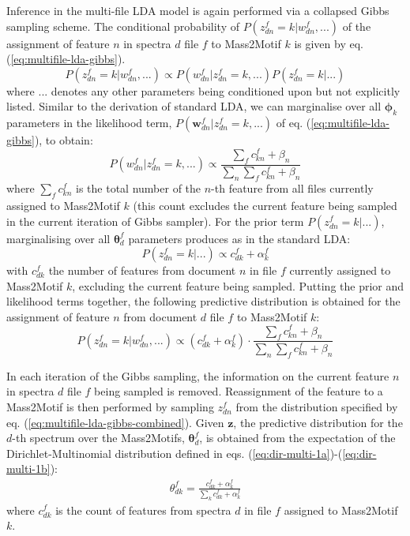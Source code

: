 Inference in the multi-file LDA model is again performed via a collapsed Gibbs sampling scheme. The conditional probability of $P({z}_{dn}^f=k \vert {w}_{dn}^f, ...)$ of the assignment of feature $n$ in spectra $d$ file $f$ to Mass2Motif $k$ is given by eq. (\ref{eq:multifile-lda-gibbs}).
\begin{equation}
P({z}_{dn}^f=k \vert {w}_{dn}^f, ...) \propto P({w}_{dn}^f \vert {z}_{dn}^f=k, ...) P({z}_{dn}^f=k \vert ...)
\label{eq:multifile-lda-gibbs}
\end{equation}
where $...$ denotes any other parameters being conditioned upon but not explicitly listed. Similar to the derivation of standard LDA, we can marginalise over all $\boldsymbol{\phi}_k$ parameters in the likelihood term, $P(\boldsymbol{w}_{dn}^f \vert {z}_{dn}^f=k, ...)$ of eq. (\ref{eq:multifile-lda-gibbs}), to obtain:
\begin{equation}
P({w}_{dn}^f \vert {z}_{dn}^f=k, ...) \propto \frac{\sum_{f} c_{kn}^f + {\beta}_n}{\sum_{n}\sum_{f} c_{kn}^f + {\beta}_n}
\label{eq:multifile-lda-gibbs-likelihood}
\end{equation}
where $\sum_{f} c_{kn}^f$ is the total number of the $n$-th feature from all files currently assigned to Mass2Motif $k$ (this count excludes the current feature being sampled in the current iteration of Gibbs sampler). For the prior term $P({z}_{dn}^f=k \vert ...)$, marginalising over all $\boldsymbol{\theta}_{d}^f$ parameters produces as in the standard LDA:
\begin{equation}
P({z}_{dn}^f=k \vert ...) \propto  c_{dk}^f + {\alpha}^f_k
\label{eq:multifile-lda-gibbs-prior}
\end{equation}
with $c_{dk}^f$ the number of features from document $n$ in file $f$ currently assigned to Mass2Motif $k$, excluding the current feature being sampled. 
Putting the prior and likelihood terms together, the following predictive distribution is obtained for the assignment of feature $n$ from document $d$ file $f$ to Mass2Motif $k$:
\begin{equation}
P({z}_{dn}^f=k \vert {w}_{dn}^f, ...) \propto (c_{dk}^f + {\alpha}^f_k) \cdot \frac{\sum_{f} c_{kn}^f + {\beta}_n}{\sum_{n}\sum_{f} c_{kn}^f + {\beta}_n}
\label{eq:multifile-lda-gibbs-combined}
\end{equation}

In each iteration of the Gibbs sampling, the information on the current feature $n$ in spectra $d$ file $f$ being sampled is removed. Reassignment of the feature to a Mass2Motif is then performed by sampling ${z}_{dn}^f$ from the distribution specified by eq. (\ref{eq:multifile-lda-gibbs-combined}). Given $\boldsymbol{z}$, the predictive distribution for the $d$-th spectrum over the Mass2Motifs, $\boldsymbol{\theta}_{d}^f$, is obtained from the expectation of the Dirichlet-Multinomial distribution defined in eqs. (\ref{eq:dir-multi-1a})-(\ref{eq:dir-multi-1b}):
\begin{align}
{\theta}_{dk}^f = \frac{c_{dk}^f+{\alpha}^f_k}{\sum_{k} c_{dk}^f+{\alpha}^f_k}
\end{align}
where $c_{dk}^f$ is the count of features from spectra $d$ in file $f$ assigned to Mass2Motif $k$. 

